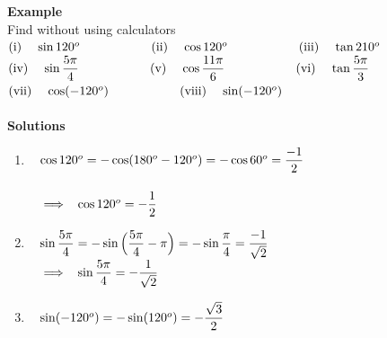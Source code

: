 \documentclass[11pt,a4paper]{article}
\begin{document}
\textbf{Example}\\
Find without using calculators\\

$(\text{i})\hspace{0.4cm} \sin 120^o\hspace{2cm} (\text{ii})\hspace{0.4cm} \cos 120^o\hspace{2cm} (\text{iii})\hspace{0.4cm} \tan 210^o$\\

$(\text{iv})\hspace{0.4cm} \sin \dfrac{5\pi}{4}\hspace{2cm} (\text{v})\hspace{0.4cm} \cos \dfrac{11\pi}{6}\hspace{2cm} (\text{vi})\hspace{0.4cm} \tan \dfrac{5\pi}{3}$\\

$(\text{vii})\hspace{0.4cm} \cos (- 120^o)\hspace{2cm} (\text{viii})\hspace{0.4cm} \sin (- 120^o)\hspace{2cm}$\\\\




\textbf{Solutions}
\begin{enumerate}
\item[ii.] $\hspace{0.3cm} \cos 120^o = - \cos (180^o - 120^o ) = - \cos 60^o = \dfrac{-1}{2}$\\\\
       $\hspace{0.3cm} \implies\hspace{0.2cm} \cos 120^o = -\dfrac{1}{2}$\\



\item[iv.] $\hspace{0.3cm} \sin \dfrac{5\pi}{4} = - \sin \Big(\dfrac{5\pi}{4}-\pi\Big)  = - \sin \dfrac{\pi}{4} = \dfrac{-1}{\sqrt{2}}$\\

$\hspace{0.3cm} \implies \hspace{0.2cm} \sin \dfrac{5\pi}{4} = -\dfrac{1}{\sqrt{2}}$\\


\item[viii.] $\hspace{0.3cm} \sin (-120^o) = -\sin (120^o) = -\dfrac{\sqrt{3}}{2}$\\\\
\end{enumerate}
\end{document}
